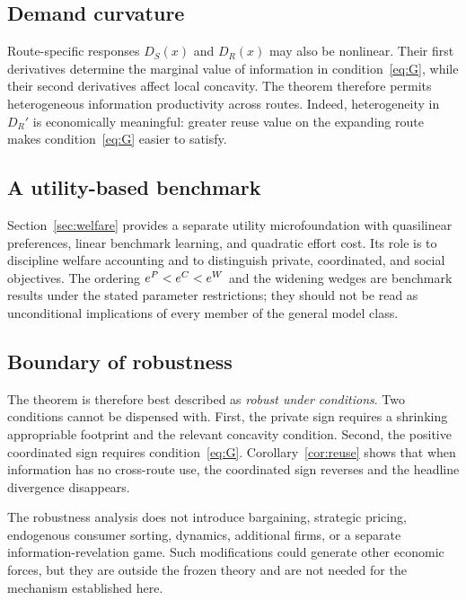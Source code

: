 \subsection{Demand curvature}

Route-specific responses $D_S(x)$ and $D_R(x)$ may also be nonlinear. Their first derivatives determine the marginal value of information in condition~\eqref{eq:G}, while their second derivatives affect local concavity. The theorem therefore permits heterogeneous information productivity across routes. Indeed, heterogeneity in $D_R'$ is economically meaningful: greater reuse value on the expanding route makes condition~\eqref{eq:G} easier to satisfy.

\subsection{A utility-based benchmark}

Section~\ref{sec:welfare} provides a separate utility microfoundation with quasilinear preferences, linear benchmark learning, and quadratic effort cost. Its role is to discipline welfare accounting and to distinguish private, coordinated, and social objectives. The ordering $e^{P}<e^{C}<e^{W}$ and the widening wedges are benchmark results under the stated parameter restrictions; they should not be read as unconditional implications of every member of the general model class.

\subsection{Boundary of robustness}

The theorem is therefore best described as \emph{robust under conditions}. Two conditions cannot be dispensed with. First, the private sign requires a shrinking appropriable footprint and the relevant concavity condition. Second, the positive coordinated sign requires condition~\eqref{eq:G}. Corollary~\ref{cor:reuse} shows that when information has no cross-route use, the coordinated sign reverses and the headline divergence disappears.

The robustness analysis does not introduce bargaining, strategic pricing, endogenous consumer sorting, dynamics, additional firms, or a separate information-revelation game. Such modifications could generate other economic forces, but they are outside the frozen theory and are not needed for the mechanism established here.
